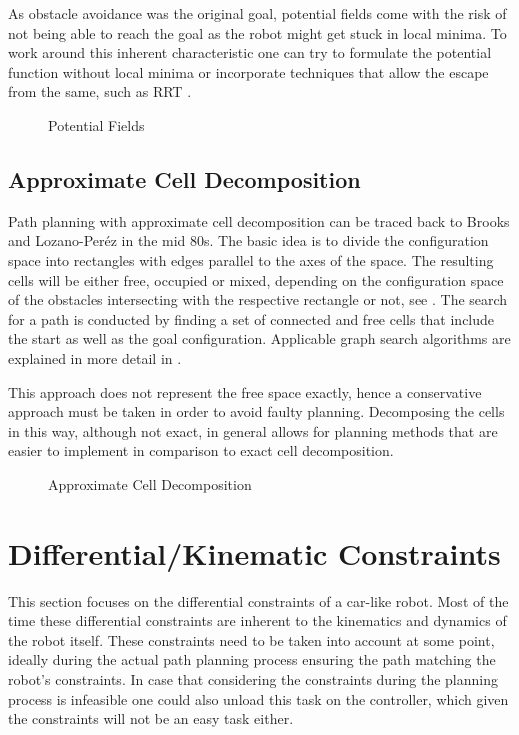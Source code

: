 As obstacle avoidance was the original goal, potential fields come with the risk of not being able to reach the goal as the robot might get stuck in local minima. To work around this inherent characteristic one can try to formulate the potential function without local minima or incorporate techniques that allow the escape from the same, such as RRT \cite{LaValle.2006}. \cite{Latombe.1991}

\begin{figure}[h]
    \caption{Potential Fields}
    \label{fig:potentialFields}
\end{figure}

\subsection{Approximate Cell Decomposition}
Path planning with approximate cell decomposition can be traced back to Brooks and Lozano-Peréz in the mid 80s. The basic idea is to divide the configuration space into rectangles with edges parallel to the axes of the space. The resulting cells will be either free, occupied or mixed, depending on the configuration space of the obstacles intersecting with the respective rectangle or not, see . The search for a path is conducted by finding a set of connected and free cells that include the start as well as the goal configuration.\cite{Brooks.1985} Applicable graph search algorithms are explained in more detail in .

This approach does not represent the free space exactly, hence a conservative approach must be taken in order to avoid faulty planning. Decomposing the cells in this way, although not exact, in general allows for planning methods that are easier to implement in comparison to exact cell decomposition. \cite{Latombe.1991}

\begin{figure}[h]
    \caption{Approximate Cell Decomposition}
    \label{fig:cellDecomposition}
\end{figure}

\section{Differential/Kinematic Constraints}\label{sec:differentialConstraints}
This section focuses on the differential constraints of a car-like robot. Most of the time these differential constraints are inherent to the kinematics and dynamics of the robot itself. These constraints need to be taken into account at some point, ideally during the actual path planning process ensuring the path matching the robot's constraints. In case that considering the constraints during the planning process is infeasible one could also unload this task on the controller, which given the constraints will not be an easy task either. \cite{LaValle.2006}


